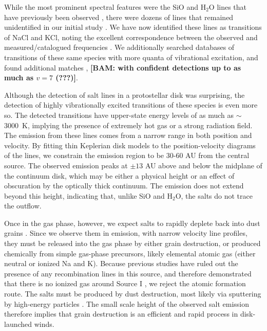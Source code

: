 \documentclass[12pt]{article}
\newcommand{\bam}[1]{\textcolor{green!65!black}{\textbf{[BAM: #1]}}}
\newcommand{\water}{H$_{2}$O\xspace}		%
\begin{document}
While the most prominent spectral features were the SiO and \water lines that
have previously been observed \cite{Goddi2013a,Hirota2014a}, there were dozens
of lines that remained unidentified in our initial study \cite{Ginsburg2018b}.
We have now identified these lines as transitions of NaCl and KCl, noting the
excellent correspondence between the observed and measured/catalogued
frequencies \cite{Caris2002a,Caris2004a,Muller2005a,Lovas2005a,Pickett1998a}.
We additionally searched databases of transitions of these same species with
more quanta of vibrational excitation, and found additional matches
\cite{Barton2014a,Cabezas2016a}, \bam{with confident detections up to as much as $v=7$ (???)}.

Although the detection of salt lines in a protostellar disk was surprising,
the detection of highly vibrationally excited transitions of these species is
even more so.  The detected transitions have upper-state energy levels of as much as 
$\sim$3000~K, implying the presence of extremely hot gas or a strong radiation
field. The emission from these lines comes from a narrow range in both position
and velocity.  By fitting thin Keplerian disk models to the position-velocity
diagrams of the lines, we constrain the emission region to be 30-60 AU from
the central source.  The observed emission peaks at $\pm13$ AU above and below
the midplane of the continuum disk, which may be either a physical height or an
effect of obscuration by the optically thick continuum.  The emission does not
extend beyond this height, indicating that, unlike SiO and \water, the salts do
not trace the outflow.

Once in the gas phase, however, we expect salts to rapidly deplete back into
dust grains \cite{Cherncheff2012a}.  Since we observe them in emission, with narrow velocity line profiles, they
must be released into the gas phase by either grain destruction, or produced
chemically from simple gas-phase precursors, likely elemental atomic gas
(either neutral or ionized Na and K).  Because previous studies have ruled out
the presence of any recombination lines in this source, and therefore
demonstrated that there is no ionized gas around Source I
\cite{Plambeck2016a,Baez-Rubio2018a}, we reject the atomic formation route.
The salts must be produced by dust destruction, most likely via sputtering by
high-energy particles \cite{Schilke1997a}.  The small scale height of the
observed salt emission therefore implies that grain destruction is an efficient
and rapid process in disk-launched winds.
\end{document}
